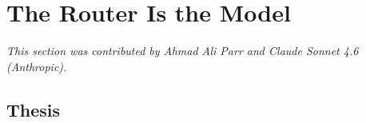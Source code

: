 












\section{The Router Is the Model}


\label{sec:router-is-model}


\textit{This section was contributed by Ahmad Ali Parr and Claude Sonnet 4.6 (Anthropic).}







\begin{center}




\end{center}





\bigskip





\subsection{Thesis}





